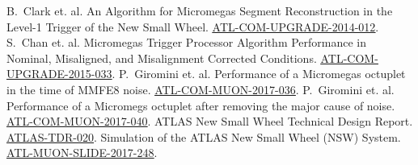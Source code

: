 \begin{thebibliography}{99}
\label{bibliography}
\setlength{\itemsep}{1.5pt plus 2.0pt minus 1.4pt}
\setlength{\parsep}{0pt}
\setlength{\parskip}{0pt}
\vspace{-6pt}

 B.~Clark et. al. An Algorithm for Micromegas Segment Reconstruction in the Level-1 Trigger of the New Small Wheel. \href{https://cds.cern.ch/record/1706160}{\color{blue}\underline{ATL-COM-UPGRADE-2014-012}}.
 S.~Chan et. al. Micromegas Trigger Processor Algorithm Performance in Nominal, Misaligned, and Misalignment Corrected Conditions. \href{https://cds.cern.ch/record/2113121}{\color{blue}\underline{ATL-COM-UPGRADE-2015-033}}.
 P.~Giromini et. al. Performance of a Micromegas octuplet in the time of MMFE8 noise. \href{https://cds.cern.ch/record/2272355}{\color{blue}\underline{ATL-COM-MUON-2017-036}}.
 P.~Giromini et. al. Performance of a Micromegs octuplet after removing the major cause of noise. \href{https://cds.cern.ch/record/2277316}{\color{blue}\underline{ATL-COM-MUON-2017-040}}.
 ATLAS New Small Wheel Technical Design Report. \href{http://cds.cern.ch/record/1552862}{\color{blue}\underline{ATLAS-TDR-020}}.
 Simulation of the ATLAS New Small Wheel (NSW) System. \href{http://cds.cern.ch/record/2265067}{\color{blue}\underline{ATL-MUON-SLIDE-2017-248}}.

\end{thebibliography}








